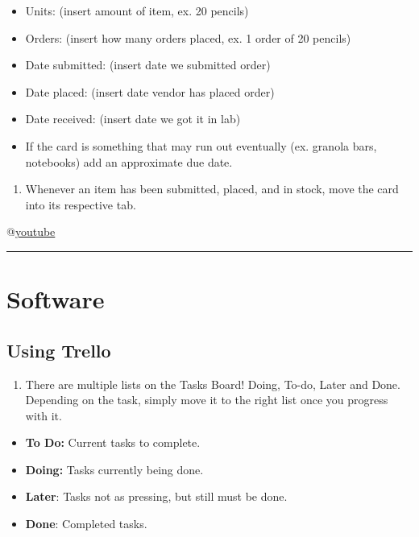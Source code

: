 \documentclass[]{book}
\providecommand{\tightlist}{%
  \setlength{\itemsep}{0pt}\setlength{\parskip}{0pt}}
\begin{document}
\begin{itemize}
\tightlist
\item
  Units: (insert amount of item, ex. 20 pencils)
\item
  Orders: (insert how many orders placed, ex. 1 order of 20 pencils)
\item
  Date submitted: (insert date we submitted order)
\item
  Date placed: (insert date vendor has placed order)
\item
  Date received: (insert date we got it in lab)
\item
  If the card is something that may run out eventually (ex. granola bars, notebooks) add an approximate due date.
\end{itemize}

\begin{enumerate}
\def\labelenumi{\arabic{enumi}.}
\setcounter{enumi}{5}
\tightlist
\item
  Whenever an item has been submitted, placed, and in stock, move the card into its respective tab.
\end{enumerate}

@\href{https://youtu.be/6YPngZ2cZto}{youtube}

\begin{center}\rule{0.5\linewidth}{\linethickness}\end{center}

\hypertarget{software}{%
\section{Software}\label{software}}

\hypertarget{using-trello}{%
\subsection{Using Trello}\label{using-trello}}

\begin{enumerate}
\def\labelenumi{\arabic{enumi}.}
\tightlist
\item
  There are multiple lists on the Tasks Board! Doing, To-do, Later and Done. Depending on the task, simply move it to the right list once you progress with it.
\end{enumerate}

\begin{itemize}
\tightlist
\item
  \textbf{To Do:} Current tasks to complete.
\item
  \textbf{Doing:} Tasks currently being done.
\item
  \textbf{Later}: Tasks not as pressing, but still must be done.
\item
  \textbf{Done}: Completed tasks.
\end{itemize}
\end{document}
